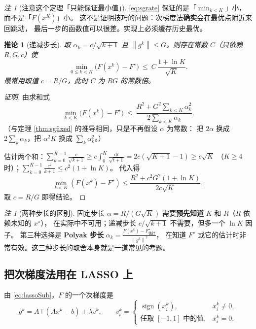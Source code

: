 \documentclass[11pt,a4paper,UTF8]{ctexart}
\theoremstyle{plain}
\newtheorem{corollary}[theorem]{推论}
\theoremstyle{definition}
\theoremstyle{remark}
\newtheorem{remark}[theorem]{注}
\newcommand{\norm}[1]{\left\lVert #1 \right\rVert}
\DeclareMathOperator{\sign}{sign}
\newcommand{\dd}{\mathrm{d}}
\begin{document}
\begin{remark}[注意这个定理「只能保证最小值」]
\eqref{eq:sgrate} 保证的是「$\min_{k<K}$」小，而不是「$F(x^K)$」小。
这不是证明技巧的问题：次梯度法\textbf{确实}会在最优点附近来回跳动，
最后一步的函数值可以很差。实现上必须缓存历史最优。
\end{remark}

\begin{corollary}[递减步长]\label{cor:sgdim}
取 $\alpha_k=c/\sqrt{k+1}$ 且 $\norm{g^k}\le G$。则存在常数 $C$（只依赖 $R,G,c$）使
\[
\min_{0\le k<K}\bigl(F(x^k)-F^\star\bigr)\ \le\ C\,\frac{1+\ln K}{\sqrt K}.
\]
最常用取值 $c=R/G$，此时 $C$ 为 $RG$ 的常数倍。
\end{corollary}

\begin{proof}[证明]
由求和式
\[
\min_{k<K}\bigl(F(x^k)-F^\star\bigr)\ \le\ \frac{R^2+G^2\sum_{k<K}\alpha_k^2}{2\sum_{k<K}\alpha_k}.
\]
（与定理 \ref{thm:sgfixed} 的推导相同，只是不再假设 $\alpha$ 为常数：
把 $2\alpha$ 换成 $2\sum_k\alpha_k$，把 $\alpha^2K$ 换成 $\sum_k\alpha_k^2$。）

估计两个和：$\sum_{k=0}^{K-1}\frac{c}{\sqrt{k+1}}\ge c\int_0^{K}\frac{\dd t}{\sqrt{t+1}}=2c(\sqrt{K+1}-1)\ge c\sqrt K$
（$K\ge4$ 时）；$\sum_{k=0}^{K-1}\frac{c^2}{k+1}\le c^2(1+\ln K)$。
代入得
\[
\min_{k<K}(F(x^k)-F^\star)\le\frac{R^2+c^2G^2(1+\ln K)}{2c\sqrt K},
\]
取 $c=R/G$ 即得结论。
\end{proof}

\begin{remark}[两种步长的区别]
固定步长 $\alpha=R/(G\sqrt K)$ 需要\textbf{预先知道} $K$ 和 $R$（$R$ 依赖未知的 $x^\star$），
在实际中不可用；递减步长 $c/\sqrt{k+1}$ 不需要，但多一个 $\ln K$ 因子。
第三种选择是 \textbf{Polyak 步长} $\alpha_k=\frac{F(x^k)-F^\star_{\text{估计}}}{\norm{g^k}^2}$，
在知道 $F^\star$ 或它的估计时非常有效。这三种步长的取舍本身就是一道常见的考题。
\end{remark}

\subsection{把次梯度法用在 LASSO 上}

由 \eqref{eq:lassoSub}，$F$ 的一个次梯度是
\begin{equation}
g^k=A\top(Ax^k-b)+\lambda v^k,\qquad
v^k_i=
\begin{cases}
\sign(x^k_i), & x^k_i\neq0,\\
\text{任取 }[-1,1]\text{ 中的值}, & x^k_i=0 .
\end{cases}
\label{eq:lassoSubgrad}
\end{equation}
\end{document}

